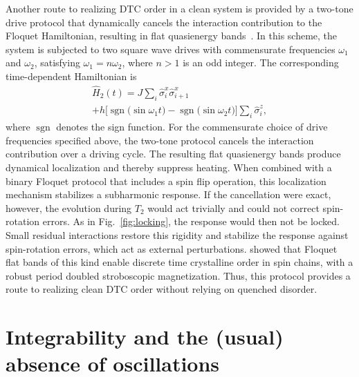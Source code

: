 \documentclass[%
reprint,
superscriptaddress,
amsmath,amssymb,
aps,
prb,
showkeys,%
floatfix,
]{revtex4-2}
\DeclareMathOperator{\Sgn}{sgn}
\let\cite\citep   %
\begin{document}
	Another route to realizing DTC order in a clean system is provided by a two-tone drive protocol that dynamically cancels the interaction contribution to the Floquet Hamiltonian, resulting in flat quasienergy bands~\cite{Banerjee_2025}. In this scheme, the system is subjected to two square wave drives with commensurate frequencies $\omega_1$ and $\omega_2$, satisfying $\omega_1=n\omega_2$, where $n>1$ is an odd integer. The corresponding time-dependent Hamiltonian is
	\begin{multline}
		\hat{H}_2(t)=J\sum_{i}\hat{\sigma}_i^x\hat{\sigma}_{i+1}^x\\
		+h\Big[\Sgn\!\big(\sin\omega_1 t\big)-\Sgn\!\big(\sin\omega_2 t\big)\Big]\sum_i\hat{\sigma}_i^z,
		\label{eq:two_tone}
	\end{multline}
	where $\Sgn$ denotes the sign function. For the commensurate choice of drive frequencies specified above, the two-tone protocol cancels the interaction contribution over a driving cycle. The resulting flat quasienergy bands produce dynamical localization and thereby suppress heating. When combined with a binary Floquet protocol that includes a spin flip operation, this localization mechanism stabilizes a subharmonic response. If the cancellation were exact, however, the evolution during $T_2$ would act trivially and could not correct spin-rotation errors. As in Fig.~\ref{fig:locking}, the response would then not be locked. Small residual interactions restore this rigidity and stabilize the response against spin-rotation errors, which act as external perturbations. \citet{rahaman2026} showed that Floquet flat bands of this kind enable discrete time crystalline order in spin chains, with a robust period doubled stroboscopic magnetization. Thus, this protocol provides a route to realizing clean DTC order without relying on quenched disorder.
	
	\section{\label{sec:integrability}Integrability and the (usual) absence of oscillations}
	
\end{document}
